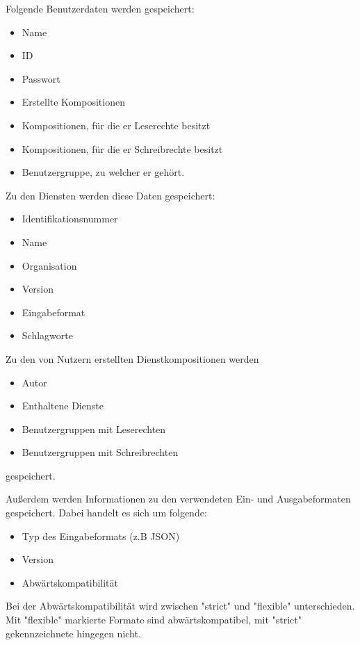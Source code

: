 Folgende Benutzerdaten werden gespeichert:
\begin{itemize}
	\item Name
	\item ID
	\item Passwort
	\item Erstellte Kompositionen
	\item Kompositionen, für die er Leserechte besitzt
	\item Kompositionen, für die er Schreibrechte besitzt
	\item Benutzergruppe, zu welcher er gehört.
\end{itemize}

Zu den Diensten werden diese Daten gespeichert:
\begin{itemize}
	\item Identifikationsnummer
	\item Name
	\item Organisation
	\item Version
	\item Eingabeformat
	\item Schlagworte
\end{itemize}

Zu den von Nutzern erstellten Dienstkompositionen werden
\begin{itemize}
	\item Autor
	\item Enthaltene Dienste
	\item Benutzergruppen mit Leserechten
	\item Benutzergruppen mit Schreibrechten
\end{itemize}
gespeichert.

Außerdem werden Informationen zu den verwendeten Ein- und Ausgabeformaten gespeichert. Dabei handelt es sich um folgende:
\begin{itemize}
	\item Typ des Eingabeformats (z.B JSON)
	\item Version
	\item Abwärtskompatibilität
\end{itemize}

Bei der Abwärtskompatibilität wird zwischen "strict" und "flexible" unterschieden. Mit "flexible" markierte Formate sind abwärtskompatibel, mit "strict" gekennzeichnete hingegen nicht.
